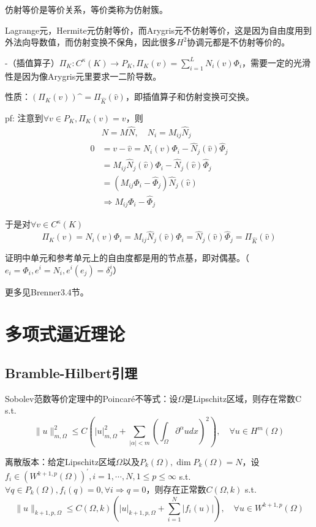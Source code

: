 仿射等价是等价关系，等价类称为仿射簇。

Lagrange元，Hermite元仿射等价，而Arygris元不仿射等价，这是因为自由度用到外法向导数值，而仿射变换不保角，因此很多$H^2$协调元都是不仿射等价的。

-（插值算子）$\Pi_K: C^\kappa(K) \to P_K, \Pi_K(v) = \sum_{i = 1}^L N_i(v) \Phi_i$，需要一定的光滑性是因为像Arygris元里要求一二阶导数。

性质：$(\Pi_K(v))\sphat = \Pi_{\widehat{K}}(\widehat{v})$，即插值算子和仿射变换可交换。

pf: 注意到$\forall v \in P_K, \Pi_K(v) = v$，则
\[
  \begin{aligned}
    &N = M \widehat{N}, \quad N_i = M_{ij} \widehat{N}_j\\
    0 &= v - \widehat{v} = N_i(v) \Phi_i - \widehat{N}_j(\widehat{v}) \widehat{\Phi}_j\\
    &= M_{ij} \widehat{N}_j (\widehat{v}) \Phi_i - \widehat{N}_j(\widehat{v}) \widehat{\Phi}_j\\
    &= (M_{ij} \Phi_i - \widehat{\Phi}_j)\widehat{N}_j(\widehat{v})\\
    &\Rightarrow M_{ij} \Phi_i - \widehat{\Phi}_j
  \end{aligned}
\]

于是对$\forall v \in C^\kappa(K)$
\[
  \Pi_K(v) = N_i(v) \Phi_i = M_{ij} \widehat{N}_j(\widehat{v}) \Phi_i = \widehat{N}_j(\widehat{v}) \widehat{\Phi}_j = \Pi_{\widehat{K}}(\widehat{v})
\]

证明中单元和参考单元上的自由度都是用的节点基，即对偶基。（$e_i = \Phi_i, e^i = N_i, e^i(e_j) = \delta^i_j$）

更多见Brenner3.4节。

\section{多项式逼近理论}

\subsection{Bramble-Hilbert引理}

Sobolev范数等价定理中的Poincaré不等式：设$\Omega$是Lipschitz区域，则存在常数C s.t.
\[
  \|u\|_{m, \Omega}^{2} \le C\left(|u|_{m, \Omega}^{2}+\sum_{|\alpha|<m}\left(\int_{\Omega} \partial^{\alpha} u dx\right)^{2}\right), \quad \forall u \in H^{m}(\Omega)
\]

离散版本：给定Lipschitz区域$\Omega$以及$P_{k}(\Omega), \operatorname{dim} P_{k}(\Omega) = N$，设$f_{i} \in \left(W^{k+1, p}(\Omega)\right)^{\prime}, i = 1, \cdots, N, 1 \le p \le \infty$ s.t. $\forall q \in P_{k}(\Omega), f_{i}(q)=0, \forall i \Rightarrow q=0$，则存在正常数$C(\Omega, k)$ s.t. 
\[
  \|u\|_{k+1, p, \Omega} \le C(\Omega, k)\left(|u|_{k+1, p, \Omega}+\sum_{i=1}^{N}\left|f_{i}(u)\right|\right), \quad \forall u \in W^{k+1, p}(\Omega)
\]

